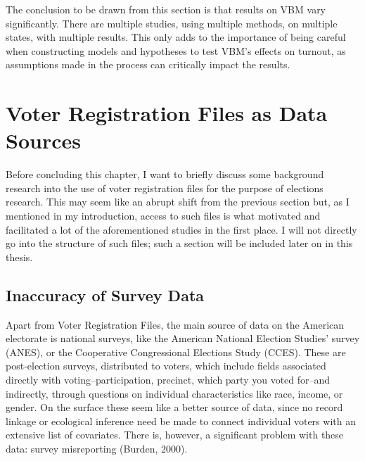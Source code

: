 \documentclass[12pt,twoside]{reedthesis}
\begin{document}
  The conclusion to be drawn from this section is that results on VBM vary
  significantly. There are multiple studies, using multiple methods, on
  multiple states, with multiple results. This only adds to the importance
  of being careful when constructing models and hypotheses to test VBM's
  effects on turnout, as assumptions made in the process can critically
  impact the results.
  
  \section{Voter Registration Files as Data
  Sources}\label{voter-registration-files-as-data-sources}
  
  Before concluding this chapter, I want to briefly discuss some
  background research into the use of voter registration files for the
  purpose of elections research. This may seem like an abrupt shift from
  the previous section but, as I mentioned in my introduction, access to
  such files is what motivated and facilitated a lot of the aforementioned
  studies in the first place. I will not directly go into the structure of
  such files; such a section will be included later on in this thesis.
  
  \subsection{Inaccuracy of Survey Data}\label{inaccuracy-of-survey-data}
  
  Apart from Voter Registration Files, the main source of data on the
  American electorate is national surveys, like the American National
  Election Studies' survey (ANES), or the Cooperative Congressional
  Elections Study (CCES). These are post-election surveys, distributed to
  voters, which include fields associated directly with
  voting--participation, precinct, which party you voted for--and
  indirectly, through questions on individual characteristics like race,
  income, or gender. On the surface these seem like a better source of
  data, since no record linkage or ecological inference need be made to
  connect individual voters with an extensive list of covariates. There
  is, however, a significant problem with these data: survey misreporting
  (Burden, 2000).
  
\end{document}
